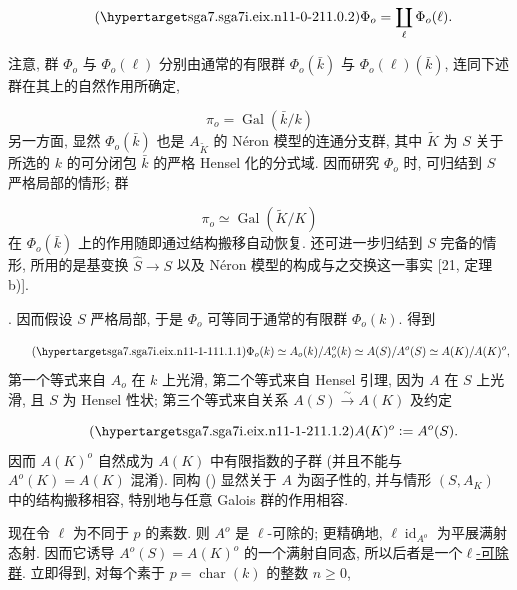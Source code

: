 \begin{equation}\tag{\SGARefTarget{sga7.sga7i.eix.n11-0-2}{11.0.2}}
\Phi_o=\coprod_\ell\Phi_o(\ell).
\end{equation}

注意, 群 $\Phi_o$ 与 $\Phi_o(\ell)$ 分别由通常的有限群 $\Phi_o(\bar k)$ 与 $\Phi_o(\ell)(\bar k)$, 连同下述群在其上的自然作用所确定,

\begin{equation*}
\pi_o=\operatorname{Gal}(\bar k/k)
\end{equation*}
另一方面, 显然 $\Phi_o(\bar k)$ 也是 $A_{\widetilde K}$ 的 N\'eron 模型的连通分支群, 其中 $\widetilde K$ 为 $S$ 关于所选的 $k$ 的可分闭包 $\bar k$ 的严格 Hensel 化的分式域. 因而研究 $\Phi_o$ 时, 可归结到 $S$ 严格局部的情形; 群

\begin{equation*}
\pi_o\simeq\operatorname{Gal}(\widetilde K/K)
\end{equation*}
在 $\Phi_o(\bar k)$ 上的作用随即通过结构搬移自动恢复. 还可进一步归结到 $S$ 完备的情形, 所用的是基变换 $\widehat S\longrightarrow S$ 以及 N\'eron 模型的构成与之交换这一事实 [21, 定理~ b)].

\smallskip
\noindent
{}. 因而假设 $S$ 严格局部, 于是 $\Phi_o$ 可等同于通常的有限群 $\Phi_o(k)$. 得到

\begin{equation}\tag{\SGARefTarget{sga7.sga7i.eix.n11-1-1}{11.1.1}}
\Phi_o(k)\simeq A_o(k)/A_o^o(k)
 \simeq A(S)/A^o(S)
 \simeq A(K)/A(K)^o,
\end{equation}
第一个等式来自 $A_o$ 在 $k$ 上光滑, 第二个等式来自 Hensel 引理, 因为 $A$ 在 $S$ 上光滑, 且 $S$ 为 Hensel 性状; 第三个等式来自关系 $A(S)\xrightarrow{\sim}A(K)$ 及约定

\begin{equation}\tag{\SGARefTarget{sga7.sga7i.eix.n11-1-2}{11.1.2}}
A(K)^o\mathrel{\mathop:}=A^o(S).
\end{equation}
因而 $A(K)^o$ 自然成为 $A(K)$ 中有限指数的子群 (并且不能与 $A^o(K)=A(K)$ 混淆). 同构 () 显然关于 $A$ 为函子性的, 并与情形 $(S,A_K)$ 中的结构搬移相容, 特别地与任意 Galois 群的作用相容.

现在令 $\ell$ 为不同于 $p$ 的素数. 则 $A^o$ 是 $\ell$-可除的; 更精确地, $\ell\operatorname{id}_{A^o}$ 为平展满射态射. 因而它诱导 $A^o(S)=A(K)^o$ 的一个满射自同态, 所以后者是一个\underline{$\ell$-可除群}. 立即得到, 对每个素于 $p=\operatorname{char}(k)$ 的整数 $n\geq 0$,

